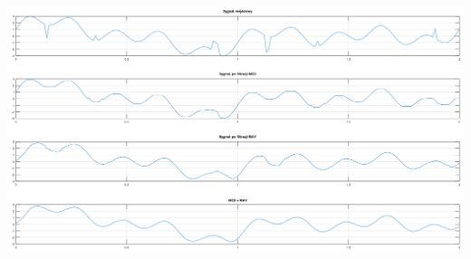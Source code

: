 \documentclass[11pt]{article}
\begin{document}
\begin{center}
	\includegraphics[width=15cm]{med2.png}
\end{center}
\end{document}
